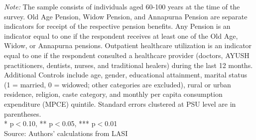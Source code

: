 \begin{table}[H]
\begin{minipage}{0.95\textwidth}
\footnotesize \textit{Note:} The sample consists of individuals aged 60-100 years at the time of the survey. Old Age Pension, Widow Pension, and Annapurna Pension are separate indicators for receipt of the respective pension benefits. Any Pension is an indicator equal to one if the respondent receives at least one of the Old Age, Widow, or Annapurna pensions. Outpatient healthcare utilization is an indicator equal to one if the respondent consulted a healthcare provider (doctors, AYUSH practitioners, dentists, nurses, and traditional healers) during the last 12 months. Additional Controls include age, gender, educational attainment, marital status (1 = married, 0 = widowed; other categories are excluded), rural or urban residence, religion, caste category, and monthly per capita consumption expenditure (MPCE) quintile. Standard errors clustered at PSU level are in parentheses. \\ * p$<$0.10, ** p$<$0.05, *** p$<$0.01\\
Source: Authors' calculations from LASI
\end{minipage}
\end{table}

